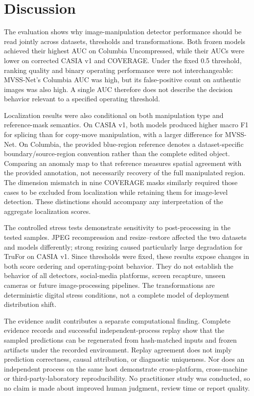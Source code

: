 \section{Discussion}

The evaluation shows why image-manipulation detector performance should be read jointly across datasets, thresholds and transformations. Both frozen models achieved their highest AUC on Columbia Uncompressed, while their AUCs were lower on corrected CASIA v1 and COVERAGE. Under the fixed 0.5 threshold, ranking quality and binary operating performance were not interchangeable: MVSS-Net's Columbia AUC was high, but its false-positive count on authentic images was also high. A single AUC therefore does not describe the decision behavior relevant to a specified operating threshold.

Localization results were also conditional on both manipulation type and reference-mask semantics. On CASIA v1, both models produced higher macro F1 for splicing than for copy-move manipulation, with a larger difference for MVSS-Net. On Columbia, the provided blue-region reference denotes a dataset-specific boundary/source-region convention rather than the complete edited object. Comparing an anomaly map to that reference measures spatial agreement with the provided annotation, not necessarily recovery of the full manipulated region. The dimension mismatch in nine COVERAGE masks similarly required those cases to be excluded from localization while retaining them for image-level detection. These distinctions should accompany any interpretation of the aggregate localization scores.

The controlled stress tests demonstrate sensitivity to post-processing in the tested samples. JPEG recompression and resize--restore affected the two datasets and models differently; strong resizing caused particularly large degradation for TruFor on CASIA v1. Since thresholds were fixed, these results expose changes in both score ordering and operating-point behavior. They do not establish the behavior of all detectors, social-media platforms, screen recapture, unseen cameras or future image-processing pipelines. The transformations are deterministic digital stress conditions, not a complete model of deployment distribution shift.

The evidence audit contributes a separate computational finding. Complete evidence records and successful independent-process replay show that the sampled predictions can be regenerated from hash-matched inputs and frozen artifacts under the recorded environment. Replay agreement does not imply prediction correctness, causal attribution, or diagnostic uniqueness. Nor does an independent process on the same host demonstrate cross-platform, cross-machine or third-party-laboratory reproducibility. No practitioner study was conducted, so no claim is made about improved human judgment, review time or report quality.

